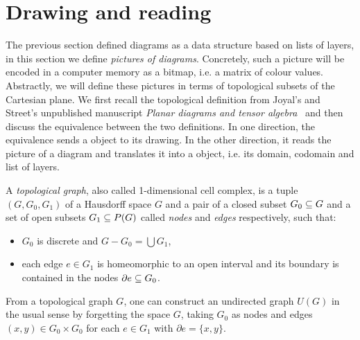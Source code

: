 
\section{Drawing and reading}

The previous section defined diagrams as a data structure based on lists of layers, in this section we define \emph{pictures of diagrams}.
Concretely, such a picture will be encoded in a computer memory as a bitmap, i.e. a matrix of colour values.
Abstractly, we will define these pictures in terms of topological subsets of the Cartesian plane.
We first recall the topological definition from Joyal's and Street's unpublished manuscript \emph{Planar diagrams and tensor algebra}~\cite{JoyalStreet88} and then discuss the equivalence between the two definitions.
In one direction, the equivalence sends a  object to its drawing.
In the other direction, it reads the picture of a diagram and translates it into a  object, i.e. its domain, codomain and list of layers.

A \emph{topological graph}, also called 1-dimensional cell complex, is a tuple $(G, G_0, G_1)$ of a Hausdorff space $G$ and a pair of a closed subset $G_0 \subseteq G$ and a set of open subsets $G_1 \subseteq P(G)$ called \emph{nodes} and \emph{edges} respectively, such that:
\begin{itemize}
\item $G_0$ is discrete and $G - G_0 = \bigcup G_1$,
\item each edge $e \in G_1$ is homeomorphic to an open interval and its boundary is contained in the nodes $\partial e \subseteq G_0$.
\end{itemize}
From a topological graph $G$, one can construct an undirected graph $U(G)$ in the usual sense by forgetting the space $G$, taking $G_0$ as nodes and edges $(x, y) \in G_0 \times G_0$ for each $e \in G_1$ with $\partial e = \{ x, y \}$.

